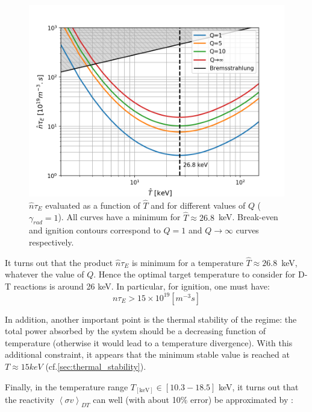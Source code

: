 \begin{figure}[h]
	\begin{center}
	\includegraphics[width=1\textwidth]{figures/ntau_e_vs_T_loglog.png}
	\end{center}
    \caption{$\hat n \tau_E$ evaluated as a function of $\hat T$ and for different values of $Q$ ($\gamma_{rad}=1$). All curves have a minimum for $\hat T\approx 26.8$~keV. Break-even and ignition contours correspond to $Q=1$ and $Q \to\infty$ curves respectively.}
	\label{fig:ntau_E_vs_T_adv}
\end{figure}


It turns out that the product $\hat n \tau_E$ is minimum for a temperature $\hat T\approx 26.8$~keV, whatever the value of $Q$. Hence the optimal target temperature to consider for D-T reactions is around 26 keV. In particular, for ignition, one must have:
\begin{equation*}
    n \tau_E > 15 \times 10^{19} \si{\left[m^{-3} s \right]} 
\end{equation*}

In addition, another important point is the thermal stability of the regime: the total power absorbed by the system should be a decreasing function of temperature (otherwise it would lead to a temperature divergence). With this additional constraint, it appears that the minimum stable value is reached at $T\approx 15 \si{keV}$ (cf.\ref{sec:thermal_stability}).


Finally, in the temperature range $T_{\mathrm{[keV]}} \in [10.3-18.5]$ keV, it turns out that the reactivity $\left< \sigma v \right>_{DT}$ can well (with about 10$\%$ error) be approximated by \cite[(1.5.4)]{Wesson2004}: 

